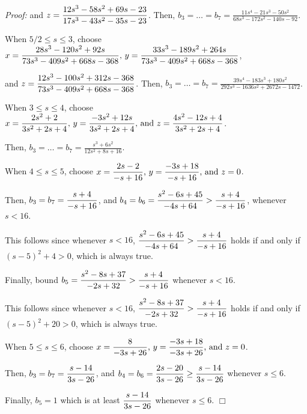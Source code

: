 \documentclass[11pt]{article}
\newcommand\QED{\ifhmode\allowbreak\else\nobreak\fi
\quad\nobreak$\Box$\medbreak}
\newcommand{\proofstart}{\par\noindent \emph{Proof:} }
\newcommand{\proofend}{\QED\par}
\newenvironment{proof}{\proofstart}{\proofend}
\begin{document}
\begin{proof}
\noindent and ${\displaystyle z = {12s^3 - 58s^2 + 69s - 23 \over 17s^3 - 43s^2 - 35s - 23}}$. Then, $b_3 = \ldots = b_7 = {\displaystyle \frac{11s^4 - 21s^3 - 50s^2}{68s^3 - 172s^2 - 140s - 92}}$.\\\bigskip

\noindent When $5/2 \leq s \leq 3$, choose ${\displaystyle x = {28s^3 - 120s^2 + 92s \over 73s^3 -409s^2 + 668s - 368}\mbox{, }y = {33s^3 - 189 s^2 + 264s \over 73s^3 -409s^2 + 668s - 368}}$, \medskip

\noindent and ${\displaystyle z = {12s^3 - 100s^2 + 312s - 368 \over 73s^3 -409s^2 + 668s - 368}}$.  Then, $b_3 = \ldots = b_7 = {\displaystyle \frac{39s^4 - 183s^3 + 180s^2}{292s^3 - 1636s^2 + 2672s - 1472}}$.\\\bigskip

\noindent When $3 \leq s \leq 4$, choose ${\displaystyle x = {2s^2 + 2 \over 3s^2 + 2s + 4}\mbox{, }y = {-3s^2 + 12s \over 3s^2 + 2s + 4}\mbox{, and }z =  {4s^2 - 12s + 4 \over 3s^2 + 2s + 4}}$.\medskip

\noindent Then, $b_3 = \ldots = b_7 = {\displaystyle \frac{s^3 + 6s^2}{12s^2 + 8s + 16} }$.\\\bigskip

\noindent When $4 \leq s \leq 5$, choose ${\displaystyle x = {2s - 2 \over -s + 16}\mbox{, }y = {-3s + 18 \over -s + 16}\mbox{, and }z =  0}$.\medskip

\noindent Then, $b_3 = b_7 = {\displaystyle {s + 4 \over -s + 16}}$, and $b_4 = b_6 = {\displaystyle \frac{s^2 - 6s + 45}{-4s + 64}} > {\displaystyle {s + 4 \over -s + 16}}$, whenever $s < 16$.\medskip

\noindent This follows since whenever $s < 16$, ${\displaystyle \frac{s^2 - 6s + 45}{-4s + 64} > {s + 4 \over -s + 16}}$ holds if and only if $(s - 5)^2 + 4 > 0$, which is always true.\medskip

\noindent Finally, bound $b_5 = {\displaystyle {s^2 - 8s + 37 \over -2s + 32} > {s + 4 \over -s + 16}}$ whenever $s < 16$. \medskip

\noindent This follows since whenever $s < 16$, ${\displaystyle {s^2 - 8s + 37 \over -2s + 32} > {s + 4 \over -s + 16}}$ holds if and only if $(s - 5)^2 + 20 > 0$, which is always true.\\\bigskip

\noindent When $5 \leq s \leq 6$, choose ${\displaystyle x = {8 \over -3s + 26}\mbox{, }y = {-3s + 18 \over -3s + 26}\mbox{, and }z =  0}$.\medskip

\noindent Then, $b_3 = b_7 = {\displaystyle {s - 14 \over 3s - 26}}$, and $b_4 = b_6 = {\displaystyle {2s - 20 \over 3s - 26}} \geq {\displaystyle {s - 14 \over 3s - 26}}$ whenever $s \leq 6$.\medskip

\noindent Finally, $b_5 = 1$ which is at least ${\displaystyle {s - 14 \over 3s - 26}}$  whenever $s \leq 6$.
\end{proof}
\end{document}
